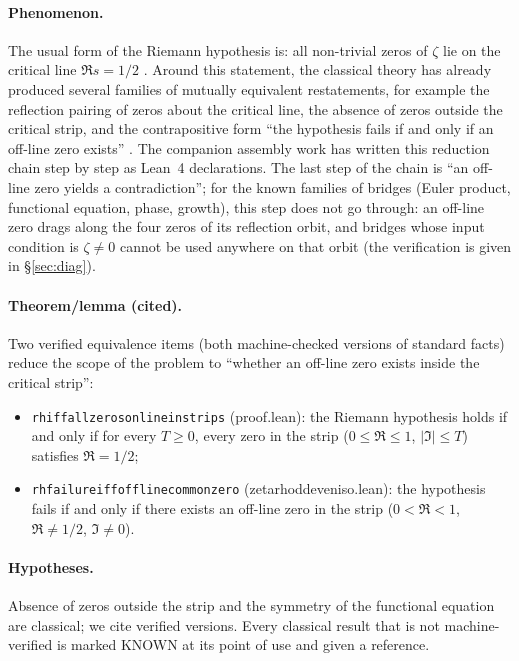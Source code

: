 \documentclass{article}
\renewcommand{\_}{\underscoreOrig\allowbreak}
\newcommand{\zt}{\zeta}
\begin{document}
\paragraph{Phenomenon.} The usual form of the Riemann hypothesis is: all
non-trivial zeros of $\zt$ lie on the critical line $\Re s=1/2$
\cite{riemann1859, edwards1974, ivic1985}. Around this statement, the
classical theory has already produced several families of mutually
equivalent restatements, for example the reflection pairing of zeros
about the critical line, the absence of zeros outside the critical strip,
and the contrapositive form ``the hypothesis fails if and only if an
off-line zero exists'' \cite{titchmarsh}. The companion assembly work has
written this reduction chain step by step as Lean~4 declarations. The
last step of the chain is ``an off-line zero yields a contradiction'';
for the known families of bridges (Euler product, functional equation,
phase, growth), this step does not go through: an off-line zero drags
along the four zeros of its reflection orbit, and bridges whose input
condition is $\zt\ne0$ cannot be used anywhere on that orbit (the
verification is given in \S\ref{sec:diag}).

\paragraph{Theorem/lemma (cited).} Two verified equivalence items (both
machine-checked versions of standard facts) reduce the scope of the
problem to ``whether an off-line zero exists inside the critical strip'':
\begin{itemize}
\item \texttt{rh\_iff\_all\_zeros\_on\_line\_in\_strips} (proof.lean):
the Riemann hypothesis holds if and only if for every $T\ge0$, every zero
in the strip ($0\le\Re\le1$, $|\Im|\le T$) satisfies $\Re=1/2$;
\item \texttt{rh\_failure\_iff\_offline\_common\_zero}
(zeta\_rh\_oddeven\_iso.lean): the hypothesis fails if and only if there
exists an off-line zero in the strip ($0<\Re<1$, $\Re\ne1/2$,
$\Im\ne0$).
\end{itemize}

\paragraph{Hypotheses.} Absence of zeros outside the strip and the
symmetry of the functional equation are classical; we cite verified
versions. Every classical result that is not machine-verified is marked
KNOWN at its point of use and given a reference.
\end{document}
